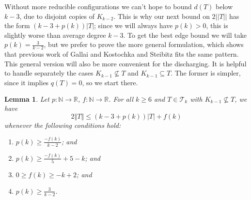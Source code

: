 \documentclass[12pt]{article}
\theoremstyle{plain}
\newtheorem{lem}[thm]{Lemma}
\theoremstyle{definition}
\theoremstyle{remark}
\newcommand{\fancy}[1]{\mathcal{#1}}
\newcommand{\IN}{\mathbb{N}}
\newcommand{\IR}{\mathbb{R}}
\newcommand{\T}{\fancy{T}}
\newcommand{\card}[1]{\left|#1\right|}
\newcommand{\size}[1]{\left\Vert#1\right\Vert}
\newcommand{\func}[3]{#1\colon #2 \rightarrow #3}
\begin{document}
Without more reducible configurations we can't hope to bound $d(T)$ below
$k-3$, due to disjoint copies of $K_{k-2}$.  This is why our next bound on $2||T||$ has the form
$(k-3 + p(k))|T|$; since we will always have $p(k)>0$, this is slightly worse than average degree $k-3$.
To get the best edge bound we will take $p(k)=\frac3{k-2}$,
but we prefer to prove the more general formulation, which shows that previous work of Gallai and Kostochka and
Steibitz fits the same pattern.  This general version will also be more convenient for the discharging.
%
It is helpful to handle separately the cases $K_{k-1}\not\subseteq T$ and
$K_{k-1}\subseteq T$.  The former is simpler, since it implies $q(T)=0$, so we
start there.

\begin{lem}\label{BoundFamilyWithoutKKMinusOne}
	Let $\func{p}{\IN}{\IR}$, $\func{f}{\IN}{\IR}$.
	For all $k \ge 6$ and $T \in \T_k$ with $K_{k-1} \not \subseteq T$, we have
	\[2\size{T} \le (k-3 + p(k))\card{T} + f(k)\]
	whenever the following conditions hold:
	\begin{enumerate}
		\item $p(k) \ge \frac{-f(k)}{k-2}$; and
		\item $p(k) \ge \frac{-f(k)}{5} + 5 - k$; and
		\item $0\ge f(k)\ge -k+2$; and
		\item $p(k) \ge \frac{3}{k-2}$.
	\end{enumerate}
\end{lem}
\end{document}
